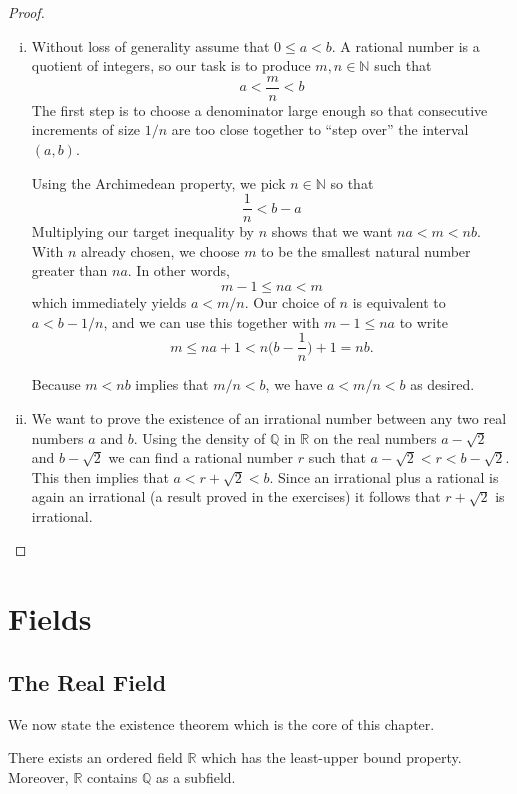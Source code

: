  \begin{proof}
 \begin{enumerate}[(i)]
 	\item Without loss of generality assume that $0 \leq a < b$.  A rational number is a quotient of integers, so our task is to produce $m, n \in \mathbb{N}$ such that 
	\[	a  < \frac{m}{n} < b	\]
 The first step is to choose a denominator large enough so that consecutive increments of size $1/n$ are too close together to ``step over'' the interval $(a,b)$.
 
 Using the Archimedean property, we pick $n \in \mathbb{N}$ so that 
 \[		\frac{1}{n} < b-a\]
Multiplying our target inequality by $n$ shows that we want $na < m <nb$.  With $n$ already chosen, we choose $m$ to be the smallest natural number greater than $na$.  In other words,
$$m-1 \leq na < m$$ 
which immediately yields $a < m/n$.  Our choice of $n$ is equivalent to $a< b - 1/n$, and we can use this together with $m - 1 \leq na$ to write
\[ m \leq na + 1 < n \Big( b - \frac{1}{n} \Big) + 1 = nb. \]

Because $m<nb$ implies that $m/n < b$, we have $a<m/n <b$ as desired.

\item  We want to prove the existence of an irrational number between any two real numbers $a$ and $b$.  Using the density of $\mathbb{Q}$ in $\mathbb{R}$ on the real numbers $a - \sqrt{2}$ and $b - \sqrt{2}$ we can find a rational number $r$ such that $a - \sqrt{2} < r < b - \sqrt{2}$.  This then implies that $a< r + \sqrt{2} < b$.  Since an irrational plus a rational is again an irrational (a result proved in the exercises) it follows that $r + \sqrt{2}$ is irrational.

 
 \end{enumerate}
 \end{proof}





\section{Fields}
\subsection{The Real Field}

We now state the existence theorem which is the core of this chapter.

\begin{theorem}  There exists an ordered field $\mathbb{R}$ which has the least-upper bound property.   Moreover, $\mathbb{R}$ contains $\mathbb{Q}$ as a subfield. \end{theorem}


